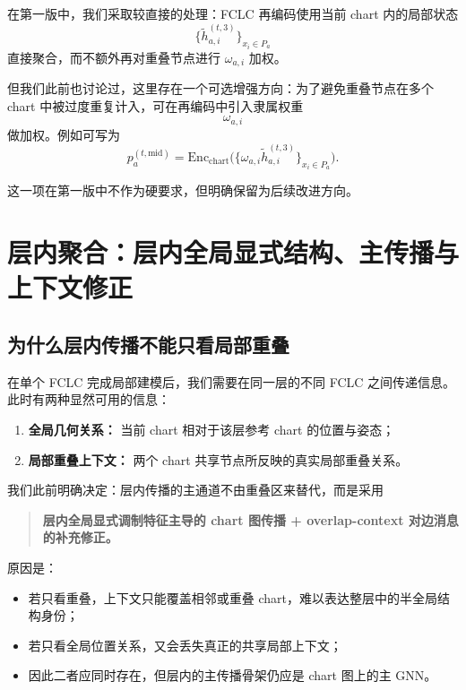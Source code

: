 \documentclass[12pt,a4paper]{ctexart}
\begin{document}
在第一版中，我们采取较直接的处理：FCLC 再编码使用当前 chart 内的局部状态
\[
\{\tilde h_{a,i}^{(t,3)}\}_{x_i\in P_a}
\]
直接聚合，而不额外再对重叠节点进行 \(\omega_{a,i}\) 加权。

但我们此前也讨论过，这里存在一个可选增强方向：为了避免重叠节点在多个 chart 中被过度重复计入，可在再编码中引入隶属权重
\[
\omega_{a,i}
\]
做加权。例如可写为
\[
p_a^{(t,\mathrm{mid})}
=
\mathrm{Enc}_{\mathrm{chart}}
\big(
\{\omega_{a,i}\tilde h_{a,i}^{(t,3)}\}_{x_i\in P_a}
\big).
\]

这一项在第一版中不作为硬要求，但明确保留为后续改进方向。

\section{层内聚合：层内全局显式结构、主传播与上下文修正}

\subsection{为什么层内传播不能只看局部重叠}

在单个 FCLC 完成局部建模后，我们需要在同一层的不同 FCLC 之间传递信息。此时有两种显然可用的信息：

\begin{enumerate}[leftmargin=2em]
    \item \textbf{全局几何关系：} 当前 chart 相对于该层参考 chart 的位置与姿态；
    \item \textbf{局部重叠上下文：} 两个 chart 共享节点所反映的真实局部重叠关系。
\end{enumerate}

我们此前明确决定：层内传播的主通道不由重叠区来替代，而是采用

\begin{quote}
\textbf{层内全局显式调制特征主导的 chart 图传播 + overlap-context 对边消息的补充修正。}
\end{quote}

原因是：

\begin{itemize}[leftmargin=2em]
    \item 若只看重叠，上下文只能覆盖相邻或重叠 chart，难以表达整层中的半全局结构身份；
    \item 若只看全局位置关系，又会丢失真正的共享局部上下文；
    \item 因此二者应同时存在，但层内的主传播骨架仍应是 chart 图上的主 GNN。
\end{itemize}
\end{document}

